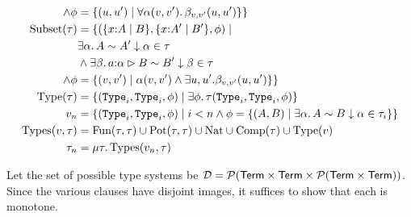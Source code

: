 \begin{align*}
    \land\phi &= \{(u,u') \mid \forall \alpha(v,v').\, \beta_{v,v'}(u,u')\}
  \}\\
  \text{Subset}(\tau) &= \{
    (\{ x {:} A \mid B\}, \{ x {:} A' \mid B'\},\phi) \mid \\
    &\exists \alpha.\, A \sim A' \downarrow \alpha \in \tau \\
    &\land\exists \beta.\, a {:} \alpha \rhd B \sim B' \downarrow \beta \in \tau \\
    \land\phi &= \{(v,v') \mid \alpha(v,v') \land \exists u,u'.\beta_{v,v'}(u,u')\}
  \}\\
  \text{Type}(\tau) &= \{(\mathtt{Type}_{i}, \mathtt{Type}_{i}, \phi) \mid \exists \phi.\, \tau(\mathtt{Type}_{i}, \mathtt{Type}_{i}, \phi)\}\\
  v_n &= \{(\mathtt{Type}_{i}, \mathtt{Type}_{i}, \phi) \mid i < n \land \phi = \{(A,B) 
  \mid \exists \alpha.\, A \sim B \downarrow \alpha \in \tau_i\}\}\\
  \text{Types}(v,\tau) &= \text{Fun}(\tau,\tau) \cup \text{Pot}(\tau,\tau) \cup \text{Nat} \cup \text{Comp}(\tau) \cup \text{Type}(v)\\
  \tau_n &= \mu \tau.\, \text{Types}(v_n,\tau)
\end{align*}

Let the set of possible type systems be $\mathcal{D} = 
\mathcal{P}(\mathsf{Term} \times \mathsf{Term} \times \mathcal{P}(\mathsf{Term} \times \mathsf{Term}))$.
Since the various clauses have disjoint images, it suffices to show that each is monotone.

\iffalse
\begin{lemma}\label{lemma:monotone}
For all $v \in \mathcal{D}$, $f : \mathcal{D} \to \mathcal{D}, \tau \mapsto \text{Types}(v,\tau)$ is a monotone function.
\end{lemma}

\begin{proof}

\begin{itemize}
\item $\text{Fun}$:\\
Suppose $\tau \subseteq \tau'$. NTS $\text{Fun}(\tau,\tau) \subseteq \text{Fun}(\tau',\tau')$. 
Suppose $(\arr{A}{\varphi}{B}{\varrho}, \arr{A'}{\varphi'}{B'}{\varrho'}, \phi)  \in \text{Fun}(\tau,\tau)$. 
Unrolling the definition, we know:
\begin{enumerate}
  \item there is a $\alpha$ s.t. \sameType{A}{A'}{\alpha}{\tau}. Then by assumption, \sameType{A}{A'}{\alpha}{\tau'}. 
  \item there is a $\beta$ s.t. \fact{\sameTypeOne{a}{\alpha}{B}{B'}{\beta}{\tau}}{1}. We show
\sameTypeOne{a}{\alpha}{B}{B'}{\beta}{\tau'}. Let $v,v'$ s.t. $\alpha(v,v')$, and show 
\sameType{[v/a]B}{[v'/a]B'}{\beta_{v,v'}}{\tau'}. But this holds by \applyAss{1}.
\end{enumerate}
Since the next three constraints are determined by $\alpha$ and $\beta$ which did not change, we conclude 
$(\arr{A}{\varphi}{B}{\varrho}, \arr{A'}{\varphi'}{B'}{\varrho'}, \phi)  \in \text{Fun}(\tau',\tau')$.
\end{itemize}
\end{proof}
\fi

